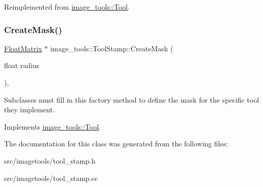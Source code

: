 Reimplemented from \hyperlink{classimage__tools_1_1Tool_a84d87d7baec8a961be236d4b30636fc0}{image\+\_\+tools\+::\+Tool}.

\mbox{\label{classimage__tools_1_1ToolStamp_a1331846ac4bcfc7aa307cf966658d056}} 
\subsubsection{\texorpdfstring{Create\+Mask()}{CreateMask()}}
{\footnotesize\ttfamily \hyperlink{classimage__tools_1_1FloatMatrix}{Float\+Matrix} $\ast$ image\+\_\+tools\+::\+Tool\+Stamp\+::\+Create\+Mask (\begin{DoxyParamCaption}\item[{float}]{radius }\end{DoxyParamCaption})\hspace{0.3cm}{\ttfamily [override]}, {\ttfamily [virtual]}}

Subclasses must fill in this factory method to define the mask for the specific tool they implement. 

Implements \hyperlink{classimage__tools_1_1Tool_a7d58325846dbc0467e52221daa1310a7}{image\+\_\+tools\+::\+Tool}.



The documentation for this class was generated from the following files\+:\begin{DoxyCompactItemize}
\item 
src/imagetools/tool\+\_\+stamp.\+h\item 
src/imagetools/tool\+\_\+stamp.\+cc\end{DoxyCompactItemize}
